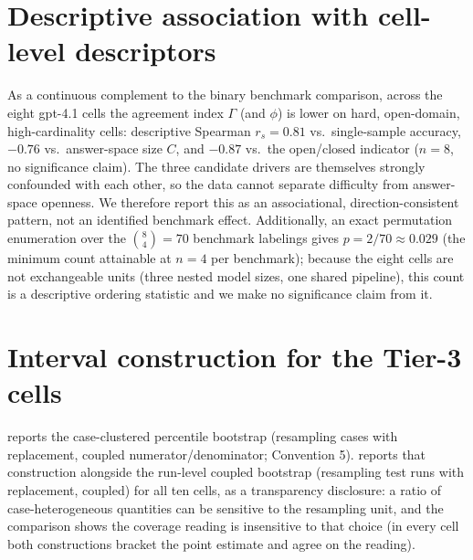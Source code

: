 \documentclass[a4paper,fleqn]{cas-sc}
\newcommand{\agreementIndex}{\Gamma}
\begin{document}
\section{Descriptive association with cell-level descriptors}
\label{app:assoc}
As a continuous complement to the binary benchmark comparison, across the eight gpt-4.1 cells the agreement index $\agreementIndex$ (and $\phi$) is lower on hard, open-domain, high-cardinality cells: descriptive Spearman $r_s=0.81$ vs.\ single-sample accuracy, $-0.76$ vs.\ answer-space size $C$, and $-0.87$ vs.\ the open/closed indicator ($n=8$, no significance claim). The three candidate drivers are themselves strongly confounded with each other, so the data cannot separate difficulty from answer-space openness. We therefore report this as an associational, direction-consistent pattern, not an identified benchmark effect. Additionally, an exact permutation enumeration over the $\binom{8}{4}=70$ benchmark labelings gives $p=2/70\approx0.029$ (the minimum count attainable at $n=4$ per benchmark); because the eight cells are not exchangeable units (three nested model sizes, one shared pipeline), this count is a descriptive ordering statistic and we make no significance claim from it.

\section{Interval construction for the Tier-3 cells}
\label{app:ci}

 reports the case-clustered percentile bootstrap
(resampling cases with replacement, coupled numerator/denominator;
Convention 5).  reports that construction alongside the
run-level coupled bootstrap (resampling test runs with replacement,
coupled) for all ten cells, as a transparency disclosure: a ratio of
case-heterogeneous quantities can be sensitive to the resampling unit,
and the comparison shows the coverage reading is insensitive to that
choice (in every cell both constructions bracket the point estimate and
agree on the reading).
\end{document}
